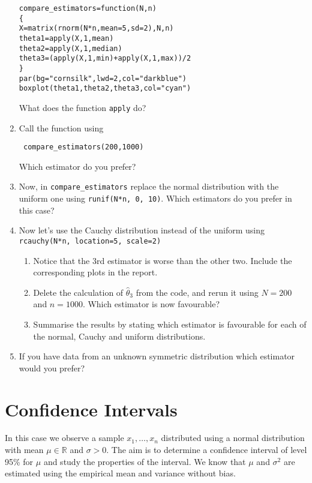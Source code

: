 \documentclass[a4paper,10pt]{article}
\begin{document}
\begin{enumerate}
\begin{lstlisting}
compare_estimators=function(N,n)
{
X=matrix(rnorm(N*n,mean=5,sd=2),N,n)
theta1=apply(X,1,mean)
theta2=apply(X,1,median)
theta3=(apply(X,1,min)+apply(X,1,max))/2
}
par(bg="cornsilk",lwd=2,col="darkblue")
boxplot(theta1,theta2,theta3,col="cyan")
\end{lstlisting}
What does the function \texttt{apply} do? 


\item Call the function using 
\begin{lstlisting}
 compare_estimators(200,1000)
\end{lstlisting}
Which estimator do you prefer? 
\item Now, in \texttt{compare\_estimators} replace the normal distribution with the uniform one using \texttt{runif(N*n, 0, 10)}. Which estimators do you prefer in this case?  
\item Now let's use the Cauchy distribution instead of the uniform using \texttt{rcauchy(N*n, location=5, scale=2)}
\begin{enumerate}
\item Notice that the 3rd estimator is worse than the other two. Include the corresponding plots in the report. 
\item Delete the calculation of $\hat{\theta}_3$ from the code, and rerun it using $N=200$ and $n=1000$. Which estimator is now favourable? 
\item Summarise  the results by stating which estimator is favourable for each of the normal, Cauchy and uniform distributions. 
\end{enumerate}
\item If you have data from an unknown symmetric distribution which estimator would you prefer? 
\end{enumerate}

\section{Confidence Intervals} 

In this case we observe a sample $x_1, \ldots, x_n$ distributed using a normal distribution with mean $\mu \in \mathbb{R}$ and $\sigma > 0$. The aim is to determine a confidence interval of level 95\% for $\mu$ and study the properties of the interval. We know that $\mu$ and $\sigma^2$ are estimated using the empirical mean and variance without bias. 
\end{document}
